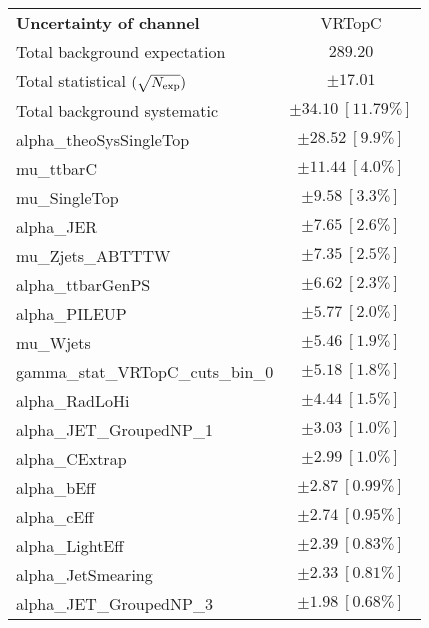 
\begin{table}
\begin{center}
\setlength{\tabcolsep}{0.0pc}
\begin{tabular*}{\textwidth}{@{\extracolsep{\fill}}lc}
\noalign{\smallskip}\hline\noalign{\smallskip}
{\bf Uncertainty of channel}                                    & VRTopC            \\
\noalign{\smallskip}\hline\noalign{\smallskip}
Total background expectation             &  $289.20$       \\
\noalign{\smallskip}\hline\noalign{\smallskip}
Total statistical $(\sqrt{N_{\rm exp}})$              & $\pm 17.01$       \\
Total background systematic               & $\pm 34.10\ [11.79\%] $             \\
\noalign{\smallskip}\hline\noalign{\smallskip}
\noalign{\smallskip}\hline\noalign{\smallskip}
alpha\_theoSysSingleTop         & $\pm 28.52\ [9.9\%] $       \\
mu\_ttbarC         & $\pm 11.44\ [4.0\%] $       \\
mu\_SingleTop         & $\pm 9.58\ [3.3\%] $       \\
alpha\_JER         & $\pm 7.65\ [2.6\%] $       \\
mu\_Zjets\_ABTTTW         & $\pm 7.35\ [2.5\%] $       \\
alpha\_ttbarGenPS         & $\pm 6.62\ [2.3\%] $       \\
alpha\_PILEUP         & $\pm 5.77\ [2.0\%] $       \\
mu\_Wjets         & $\pm 5.46\ [1.9\%] $       \\
gamma\_stat\_VRTopC\_cuts\_bin\_0         & $\pm 5.18\ [1.8\%] $       \\
alpha\_RadLoHi         & $\pm 4.44\ [1.5\%] $       \\
alpha\_JET\_GroupedNP\_1         & $\pm 3.03\ [1.0\%] $       \\
alpha\_CExtrap         & $\pm 2.99\ [1.0\%] $       \\
alpha\_bEff         & $\pm 2.87\ [0.99\%] $       \\
alpha\_cEff         & $\pm 2.74\ [0.95\%] $       \\
alpha\_LightEff         & $\pm 2.39\ [0.83\%] $       \\
alpha\_JetSmearing         & $\pm 2.33\ [0.81\%] $       \\
alpha\_JET\_GroupedNP\_3         & $\pm 1.98\ [0.68\%] $       \\

\end{tabular*}
\end{center}
\end{table}
